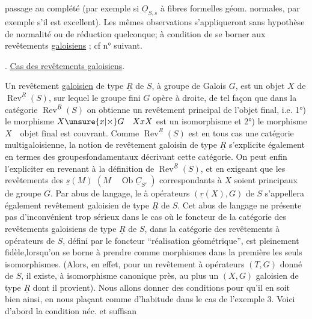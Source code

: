 
passage au complété (par exemple si $\underline{O}_{S,s}$ à fibres formelles géom. normales, par exemple s'il est excellent). Les mêmes observations s'appliqueront sans hypothèse de normalité ou de réduction quelconque; à condition de se borner aux revêtements  \uline{galoisiens} ; cf n° suivant.

. \uline{Cas des revêtements galoisiens}.

Un revêtement \uline{galoisien} de type $\underline{R}$ de $S$, à groupe de Galois $G$, est un objet $X$ de $\operatorname{Rev}^{\underline{R}}(S)$, sur lequel le groupe fini $G$ opère à droite, de tel façon que dans la catégorie $\operatorname{Rev}^{\underline{R}}(S)$ on obtienne un revêtement principal de l'objet final, i.e. 1°) le morphisme $X\unsure{x|\times}G\quad XxX$ est un isomorphisme et 2°) le morphisme $X\quad\text{objet final}$ est couvrant. Comme $\operatorname{Rev}^{\underline{R}}(S)$ est en tous cas une catégorie multigaloisienne, la notion de revêtement galoisin de type $\underline{R}$ s'explicite également en termes des groupesfondamentaux décrivant cette catégorie. On peut enfin l'expliciter en revenant à la définition de $\operatorname{Rev}^{\underline{R}}(S)$, et en exigeant que les revêtements des $\underline{s}(M)$ $(M\quad\operatorname{Ob}\underline{C}_{S'}\ )$ correspondants à $X$ soient principaux de groupe $G$. Par abus de langage, le à opérateurs $(\underline{r}(X),G)$ de $S$ s'appellera également revêtement galoisien de type $\underline{R}$ de $S$. Cet abus de langage ne présente pas d'inconvénient trop sérieux dans le cas où le foncteur de la catégorie des revêtements galoisiens de type $\underline{R}$ de $S$, dans la catégorie des revêtements à opérateurs de $S$, défini par le foncteur ``réalisation géométrique'', est pleinement fidèle,lorsqu'on se borne à prendre comme morphismes dans la première les seuls isomorphismes. (Alors, en effet, pour un revêtement à opérateurs $(T,G)$ donné de $S$, il existe, à isomorphisme canonique près, au plus un $(X,G)$  galoisien de type $\underline{R}$ dont il provient). Nous allons donner des conditions pour qu'il en soit bien ainsi, en nous plaçant comme d'habitude dans le cas de l'exemple 3. Voici d'abord la condition néc. et suffisan
